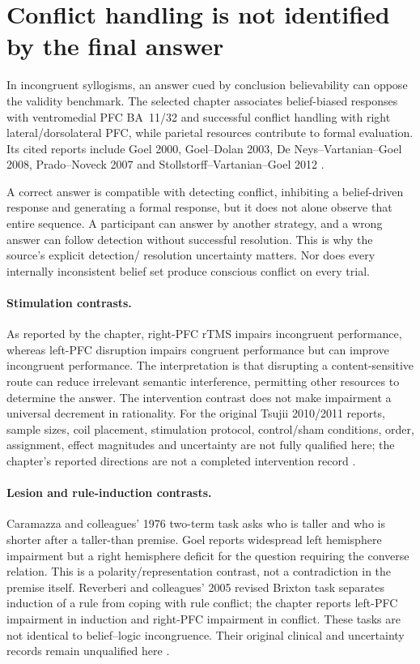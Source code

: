 \section{Conflict handling is not identified by the final answer}
\label{sec:p19-r14-conflict}

In incongruent syllogisms, an answer cued by conclusion believability
can oppose the validity benchmark. The selected chapter associates
belief-biased responses with ventromedial PFC BA~11/32 and successful
conflict handling with right lateral/dorsolateral PFC, while parietal
resources contribute to formal evaluation. Its cited reports include
Goel 2000, Goel--Dolan 2003, De Neys--Vartanian--Goel 2008,
Prado--Noveck 2007 and Stollstorff--Vartanian--Goel 2012
\cite[pp.~122--123]{Goel2021RationalityBrain}.

A correct answer is compatible with detecting conflict, inhibiting
a belief-driven response and generating a formal response, but it does
not alone observe that entire sequence. A participant can answer by
another strategy, and a wrong answer can follow detection without
successful resolution. This is why the source's explicit detection/
resolution uncertainty matters. Nor does every internally inconsistent
belief set produce conscious conflict on every trial.

\paragraph{Stimulation contrasts.}
As reported by the chapter, right-PFC rTMS impairs incongruent
performance, whereas left-PFC disruption impairs congruent performance
but can improve incongruent performance. The interpretation is that
disrupting a content-sensitive route can reduce irrelevant semantic
interference, permitting other resources to determine the answer.
The intervention contrast does not make impairment a universal decrement
in rationality. For the original Tsujii 2010/2011 reports, sample sizes,
coil placement, stimulation protocol, control/sham conditions, order,
assignment, effect magnitudes and uncertainty are not fully qualified
here; the chapter's reported directions are not a completed intervention
record \cite[p.~123]{Goel2021RationalityBrain}.

\paragraph{Lesion and rule-induction contrasts.}
Caramazza and colleagues' 1976 two-term task asks who is taller and who
is shorter after a taller-than premise. Goel reports widespread left
hemisphere impairment but a right hemisphere deficit for the question
requiring the converse relation. This is a polarity/representation
contrast, not a contradiction in the premise itself. Reverberi and
colleagues' 2005 revised Brixton task separates induction of a rule
from coping with rule conflict; the chapter reports left-PFC impairment
in induction and right-PFC impairment in conflict. These tasks are not
identical to belief--logic incongruence. Their original clinical and
uncertainty records remain unqualified here
\cite[p.~123]{Goel2021RationalityBrain}.

